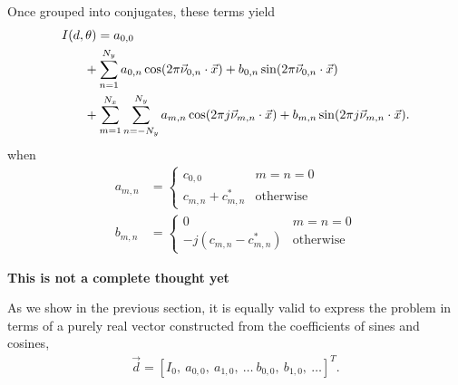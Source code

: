 \documentclass{article}
\def\x{\vec{x}}
\begin{document}
Once grouped into conjugates, these terms yield
\begin{align}
I(d,\theta) &= a_{0,0} \nonumber\\
& \hspace{-1em} + \sum_{n=1}^{N_y} a_{0,n} \cos(2\pi \vec{\nu}_{0,n} \cdot \x) + b_{0,n} \sin(2\pi \vec{\nu}_{0,n} \cdot \x)\nonumber\\
& \hspace{-1em} + \sum_{m=1}^{N_x}\sum_{n=-N_y}^{N_y} a_{m,n} \cos(2\pi j \vec{\nu}_{m,n} \cdot \x) + b_{m,n} \sin(2\pi j \vec{\nu}_{m,n} \cdot \x).
\end{align}
when
\begin{align}
a_{m,n} &= \left\{\begin{array}{c|l}
c_{0,0} & m=n=0\\
c_{m,n} + c_{m,n}^*& \mathrm{otherwise}
\end{array}\right.\\
b_{m,n} &= \left\{\begin{array}{c|l}
0 & m=n=0\\
-j(c_{m,n} - c_{m,n}^*) & \mathrm{otherwise}
\end{array}\right.
\end{align}

{\bf This is not a complete thought yet}

As we show in the previous section, it is equally valid to express the problem in terms of a purely real vector constructed from the coefficients of sines and cosines,
\begin{align}
\vec{d} = [I_0,\ a_{0,0},\ a_{1,0},\ \ldots\ b_{0,0},\ b_{1,0},\ \ldots]^T.
\end{align}
\end{document}
